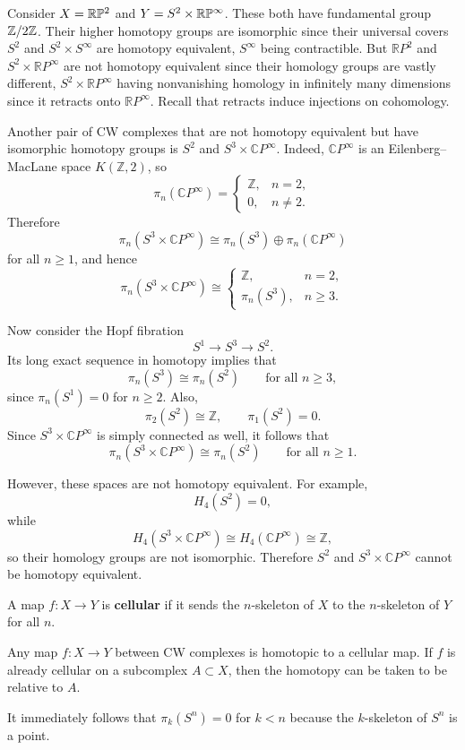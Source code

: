 \documentclass[12pt]{article}
\begin{document}
\begin{example}
    Consider \(X=\mathbb{R}\P^2\) and \(Y=S^2\times \mathbb{R}\P^\infty\). These both have fundamental group \(\mathbb{Z}/2\Z\). Their higher homotopy groups are isomorphic since their universal covers \(S^2\) and \(S^2\times S^\infty\) are homotopy equivalent, \(S^\infty\) being contractible. But \(\mathbb{R}P^2\) and \(S^2\times \mathbb{R}P^\infty\) are not homotopy equivalent since their homology groups are vastly different, \(S^2\times \mathbb{R}P^\infty\) having nonvanishing homology in infinitely many dimensions since it retracts onto \(\mathbb{R}P^\infty\). Recall that retracts induce injections on cohomology.
\end{example}

\begin{example}
Another pair of CW complexes that are not homotopy equivalent but have isomorphic homotopy groups is \(S^2\) and \(S^3\times \mathbb{C}P^\infty\). Indeed, \(\mathbb{C}P^\infty\) is an Eilenberg--MacLane space \(K(\mathbb{Z},2)\), so
\[
\pi_n(\mathbb{C}P^\infty)=
\begin{cases}
\mathbb{Z}, & n=2,\\
0, & n\neq 2.
\end{cases}
\]
Therefore
\[
\pi_n(S^3\times \mathbb{C}P^\infty)
\cong
\pi_n(S^3)\oplus \pi_n(\mathbb{C}P^\infty)
\]
for all \(n\ge 1\), and hence
\[
\pi_n(S^3\times \mathbb{C}P^\infty)\cong
\begin{cases}
\mathbb{Z}, & n=2,\\
\pi_n(S^3), & n\ge 3.
\end{cases}
\]

Now consider the Hopf fibration
\[
S^1 \longrightarrow S^3 \longrightarrow S^2.
\]
Its long exact sequence in homotopy implies that
\[
\pi_n(S^3)\cong \pi_n(S^2)
\qquad\text{for all } n\ge 3,
\]
since \(\pi_n(S^1)=0\) for \(n\ge 2\). Also,
\[
\pi_2(S^2)\cong \mathbb{Z},
\qquad
\pi_1(S^2)=0.
\]
Since \(S^3\times \mathbb{C}P^\infty\) is simply connected as well, it follows that
\[
\pi_n(S^3\times \mathbb{C}P^\infty)\cong \pi_n(S^2)
\qquad\text{for all } n\ge 1.
\]

However, these spaces are not homotopy equivalent. For example,
\[
H_4(S^2)=0,
\]
while
\[
H_4(S^3\times \mathbb{C}P^\infty)
\cong
H_4(\mathbb{C}P^\infty)
\cong
\mathbb{Z},
\]
so their homology groups are not isomorphic. Therefore \(S^2\) and \(S^3\times \mathbb{C}P^\infty\) cannot be homotopy equivalent.
\end{example}

A map $f: X \to Y$ is \textbf{cellular} if it sends the $n$-skeleton of $X$ to the $n$-skeleton of $Y$ for all $n$. \begin{theorem}
    Any map $f:X\to Y$ between CW complexes is homotopic to a cellular map. If $f$ is already cellular on a subcomplex $A\subset X$, then the homotopy can be taken to be relative to $A$.
\end{theorem}
It immediately follows that $\pi_k(S^n) = 0$ for $k < n$ because the $k$-skeleton of $S^n$ is a point.
\end{document}
